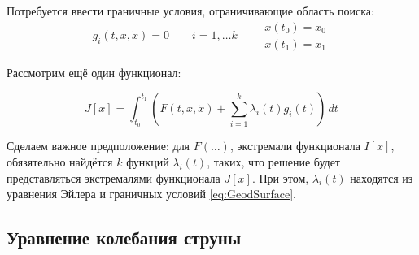 \documentclass[12pt]{article}
\begin{document}
		Потребуется ввести граничные условия, ограничивающие область поиска:
		\begin{equation} \label{eq:GeodSurface}
			g_i(t, x, \dot{x}) = 0 \qquad i = 1,\ldots k \qquad
			\begin{aligned}
				x(t_0) = x_0 \\
				x(t_1) = x_1
			\end{aligned}
		\end{equation}

		Рассмотрим ещё один функционал:

		$$J[x] = \int_{t_0}^{t_1} \left(F(t,x,\dot{x}) + \sum_{i=1}^k \lambda_i(t) g_i(t)\right)\,dt$$

		Сделаем важное предположение: для $F(\ldots)$, экстремали функционала $I[x]$, обязятельно найдётся
		$k$ функций $\lambda_i(t)$, таких, что решение будет представляться экстремалями функционала $J[x]$.
		При этом, $\lambda_i(t)$ находятся из уравнения Эйлера и граничных условий \ref{eq:GeodSurface}.

	\subsection{Уравнение колебания струны}

\end{document}
